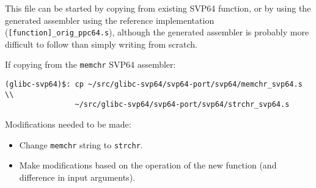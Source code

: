 This file can be started by copying from existing SVP64 function, or by using
the generated assembler using the reference implementation
(\texttt{[function]\_orig\_ppc64.s}), although the generated assembler is
probably more difficult to follow than simply writing from scratch.

If copying from the \texttt{memchr} SVP64 assembler:
\begin{verbatim}
(glibc-svp64)$: cp ~/src/glibc-svp64/svp64-port/svp64/memchr_svp64.s \\
                ~/src/glibc-svp64/svp64-port/svp64/strchr_svp64.s
\end{verbatim}

Modifications needed to be made:
\begin{itemize}
  \item Change \texttt{memchr} string to \texttt{strchr}.
  \item Make modifications based on the operation of the new function
  (and difference in input arguments).
\end{itemize}